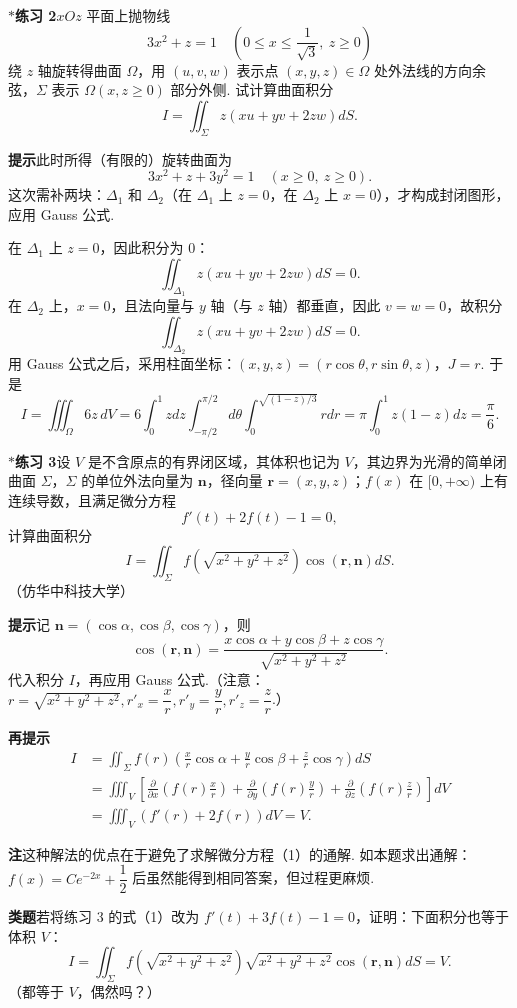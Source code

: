 \documentclass[UTF8, 12pt, fontset=fandol, oneside]{ctexart}
\begin{document}
\noindent\textbf{$*$练习 2}\quad $xOz$ 平面上抛物线
\[
3x^2+z=1\quad\left(0\le x\le\frac1{\sqrt3},\ z\ge0\right)
\]
绕 $z$ 轴旋转得曲面 $\Omega$，用 $(u,v,w)$ 表示点 $(x,y,z)\in\Omega$ 处外法线的方向余弦，$\Sigma$ 表示 $\Omega(x,z\ge0)$ 部分外侧. 试计算曲面积分
\[
I=\iint_\Sigma z(xu+yv+2zw)dS.
\]

\noindent\textbf{提示}\quad 此时所得（有限的）旋转曲面为
\[
3x^2+z+3y^2=1\quad(x\ge0,\ z\ge0).
\]
这次需补两块：$\Delta_1$ 和 $\Delta_2$（在 $\Delta_1$ 上 $z=0$，在 $\Delta_2$ 上 $x=0$），才构成封闭图形，应用 Gauss 公式.

在 $\Delta_1$ 上 $z=0$，因此积分为 $0$：
\[
\iint_{\Delta_1}z(xu+yv+2zw)dS=0.
\]
在 $\Delta_2$ 上，$x=0$，且法向量与 $y$ 轴（与 $z$ 轴）都垂直，因此 $v=w=0$，故积分
\[
\iint_{\Delta_2}z(xu+yv+2zw)dS=0.
\]
用 Gauss 公式之后，采用柱面坐标：$(x,y,z)=(r\cos\theta,r\sin\theta,z)$，$J=r$. 于是
\[
I=\iiint_\Omega6z\,dV
=6\int_0^1zdz\int_{-\pi/2}^{\pi/2}d\theta
\int_0^{\sqrt{(1-z)/3}}rdr
=\pi\int_0^1z(1-z)dz=\frac\pi6.
\]

\noindent\textbf{$*$练习 3}\quad 设 $V$ 是不含原点的有界闭区域，其体积也记为 $V$，其边界为光滑的简单闭曲面 $\Sigma$，$\Sigma$ 的单位外法向量为 $\mathbf n$，径向量 $\mathbf r=(x,y,z)$；$f(x)$ 在 $[0,+\infty)$ 上有连续导数，且满足微分方程
\[
f'(t)+2f(t)-1=0, \tag{1}
\]
计算曲面积分
\[
I=\iint_\Sigma f\left(\sqrt{x^2+y^2+z^2}\right)\cos(\mathbf r,\mathbf n)dS.
\]
（仿华中科技大学）

\noindent\textbf{提示}\quad 记 $\mathbf n=(\cos\alpha,\cos\beta,\cos\gamma)$，则
\[
\cos(\mathbf r,\mathbf n)=
\frac{x\cos\alpha+y\cos\beta+z\cos\gamma}{\sqrt{x^2+y^2+z^2}}.
\]
代入积分 $I$，再应用 Gauss 公式.（注意：$r=\sqrt{x^2+y^2+z^2},r'_x=\dfrac xr,r'_y=\dfrac yr,r'_z=\dfrac zr$.）

\noindent\textbf{再提示}\quad
\[
\begin{aligned}
I&=\iint_\Sigma f(r)\left(\frac xr\cos\alpha+\frac yr\cos\beta+\frac zr\cos\gamma\right)dS\\
&=\iiint_V\left[
\frac{\partial}{\partial x}\left(f(r)\frac xr\right)
+\frac{\partial}{\partial y}\left(f(r)\frac yr\right)
+\frac{\partial}{\partial z}\left(f(r)\frac zr\right)\right]dV\\
&=\iiint_V(f'(r)+2f(r))dV=V.
\end{aligned}
\]

\noindent\textbf{注}\quad 这种解法的优点在于避免了求解微分方程（1）的通解. 如本题求出通解：$f(x)=Ce^{-2x}+\dfrac12$ 后虽然能得到相同答案，但过程更麻烦.

\noindent\textbf{类题}\quad 若将练习 3 的式（1）改为 $f'(t)+3f(t)-1=0$，证明：下面积分也等于体积 $V$：
\[
I=\iint_\Sigma f\left(\sqrt{x^2+y^2+z^2}\right)
\sqrt{x^2+y^2+z^2}\cos(\mathbf r,\mathbf n)dS=V.
\]
（都等于 $V$，偶然吗？）
\end{document}
